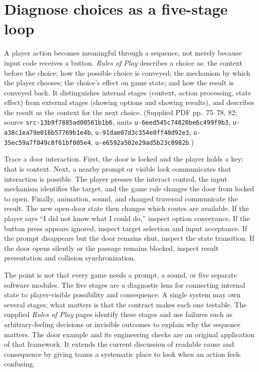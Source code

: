 \section{Diagnose choices as a five-stage loop}\label{06-engine-ii-ch047-diagnose-choices-as-a-five-stage-loop}

A player action becomes meaningful through a sequence, not merely because input code receives a button. \emph{Rules of Play} describes a choice as: the context before the choice; how the possible choice is conveyed; the mechanism by which the player chooses; the choice's effect on game state; and how the result is conveyed back. It distinguishes internal stages (context, action processing, state effect) from external stages (showing options and showing results), and describes the result as the context for the next choice. (Supplied PDF pp.~75--78, 82; source \texttt{src-13b9f7885ad00561b1b6}, units \texttt{u-6eed545c74820be6c499f9b3}, \texttt{u-a38c1ea79e016b57769b1e4b}, \texttt{u-91dae07d3c354e0ff40d92e3}, \texttt{u-35ec59a7f849c8f61bf005e4}, \texttt{u-e6592a502e29ad5b23c0982b}.)

Trace a door interaction. First, the door is locked and the player holds a key: that is context. Next, a nearby prompt or visible lock communicates that interaction is possible. The player presses the interact control, the input mechanism identifies the target, and the game rule changes the door from locked to open. Finally, animation, sound, and changed traversal communicate the result. The new open-door state then changes which routes are available. If the player says ``I did not know what I could do,'' inspect option conveyance. If the button press appears ignored, inspect target selection and input acceptance. If the prompt disappears but the door remains shut, inspect the state transition. If the door opens silently or the passage remains blocked, inspect result presentation and collision synchronization.

The point is not that every game needs a prompt, a sound, or five separate software modules. The five stages are a diagnostic lens for connecting internal state to player-visible possibility and consequence. A single system may own several stages; what matters is that the contract makes each one testable. The supplied \emph{Rules of Play} pages identify these stages and use failures such as arbitrary-feeling decisions or invisible outcomes to explain why the sequence matters. The door example and its engineering checks are an original application of that framework. It extends the current discussion of readable cause and consequence by giving teams a systematic place to look when an action feels confusing.

